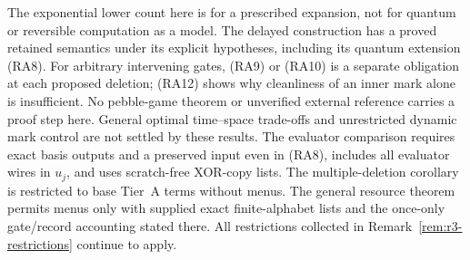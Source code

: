 \begin{remark}
The exponential lower count here is for a prescribed expansion, not for
quantum or reversible computation as a model. The delayed construction
has a proved retained semantics under its explicit hypotheses, including
its quantum extension (RA8). For arbitrary intervening gates, (RA9) or
(RA10) is a separate obligation at each proposed deletion; (RA12)
shows why cleanliness of an inner mark alone is insufficient. No
pebble-game theorem or unverified external reference carries a proof
step here. General optimal time--space trade-offs and unrestricted
dynamic mark control are not settled by these results.
The evaluator comparison requires exact basis outputs and a preserved
input even in (RA8), includes all evaluator wires in $u_j$, and uses
scratch-free XOR-copy lists. The multiple-deletion corollary is restricted
to base Tier~A terms without menus. The general resource theorem permits
menus only with supplied exact finite-alphabet lists and the once-only
gate/record accounting stated there. All restrictions collected in
Remark~\ref{rem:r3-restrictions} continue to apply.
\end{remark}
